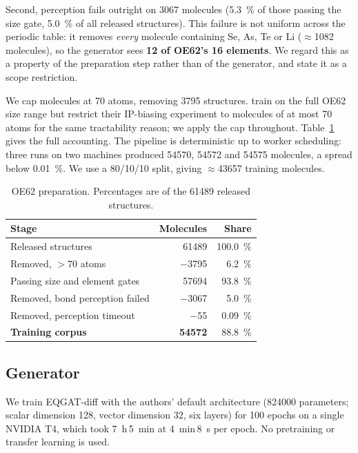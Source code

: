 \documentclass[runningheads]{llncs}
\begin{document}
Second, perception fails outright on \num{3067} molecules
(\SI{5.3}{\percent} of those passing the size gate, \SI{5.0}{\percent} of all released structures). This failure is not uniform across the periodic
table: it removes \emph{every} molecule containing Se, As, Te or Li
($\approx$\num{1082} molecules), so the generator sees
\textbf{12 of OE62's 16 elements}. We regard this as a property of the
preparation step rather than of the generator, and state it as a scope
restriction.

We cap molecules at 70 atoms, removing \num{3795} structures.
\cite{westermayr2022} train on the full OE62 size range but restrict
their IP-biasing experiment to molecules of at most 70 atoms for the
same tractability reason; we apply the cap throughout. Table~\ref{tab:funnel-data} gives the full
accounting. The pipeline is deterministic up to worker scheduling: three
runs on two machines produced \num{54570}, \num{54572} and \num{54575}
molecules, a spread below \SI{0.01}{\percent}. We use a
\num{80}/\num{10}/\num{10} split, giving $\approx$\num{43657} training
molecules.

\begin{table}[t]
\centering
\caption{OE62 preparation. Percentages are of the \num{61489} released
structures.}
\label{tab:funnel-data}
\begin{tabular}{lrr}
\toprule
Stage & Molecules & Share \\
\midrule
Released structures            & \num{61489} & \SI{100.0}{\percent} \\
Removed, $>70$ atoms           & \num{-3795} & \SI{6.2}{\percent} \\
Passing size and element gates & \num{57694} & \SI{93.8}{\percent} \\
Removed, bond perception failed& \num{-3067} & \SI{5.0}{\percent} \\
Removed, perception timeout    & \num{-55}   & \SI{0.09}{\percent} \\
\midrule
\textbf{Training corpus}       & \textbf{\num{54572}} & \SI{88.8}{\percent} \\
\bottomrule
\end{tabular}
\end{table}

\subsection{Generator}

We train EQGAT-diff with the authors' default architecture
(\num{824000} parameters; scalar dimension 128, vector dimension 32,
six layers) for 100 epochs on a single NVIDIA T4, which took
\SI{7}{\hour}\,\SI{5}{\minute} at \SI{4}{\minute}\,\SI{8}{\second} per
epoch. No pretraining or transfer learning is used.
\end{document}
